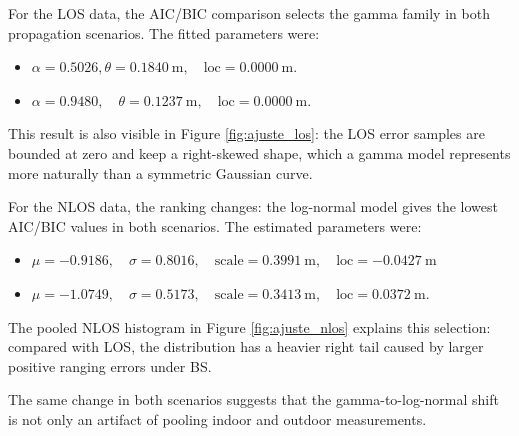 For the LOS data, the AIC/BIC comparison selects the gamma family in both propagation scenarios. The fitted parameters were:
\begin{itemize}
    \item {}  $\alpha=0.5026, \theta=0.1840~\mathrm{m},\quad \mathrm{loc}=0.0000~\mathrm{m}.$
    \item {} $ \alpha=0.9480,\quad \theta=0.1237~\mathrm{m},\quad \mathrm{loc}=0.0000~\mathrm{m}.$
\end{itemize}

This result is also visible in Figure \ref{fig:ajuste_los}: the LOS error samples are bounded at zero and keep a right-skewed shape, which a gamma model represents more naturally than a symmetric Gaussian curve.

For the NLOS data, the ranking changes: the log-normal model gives the lowest AIC/BIC values in both scenarios. The estimated parameters were:

\begin{itemize}
    \item {} $\mu=-0.9186,\quad \sigma=0.8016,\quad \mathrm{scale}=0.3991~\mathrm{m},\quad \mathrm{loc}=-0.0427~\mathrm{m}$
    \item {}  $\mu=-1.0749,\quad \sigma=0.5173,\quad \mathrm{scale}=0.3413~\mathrm{m},\quad \mathrm{loc}=0.0372~\mathrm{m}$.
\end{itemize}


The pooled NLOS histogram in Figure \ref{fig:ajuste_nlos} explains this selection: compared with LOS, the distribution has a heavier right tail caused by larger positive ranging errors under BS.

The same change in both scenarios suggests that the gamma-to-log-normal shift is not only an artifact of pooling indoor and outdoor measurements.


